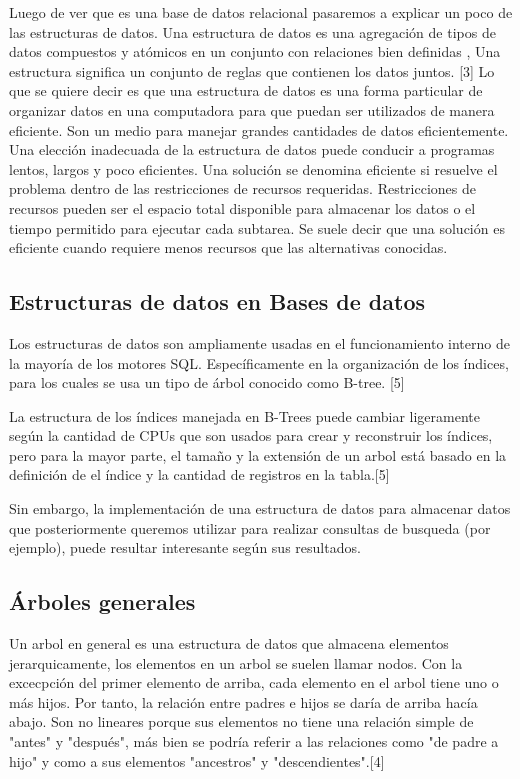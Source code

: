 \documentclass[twoside,twocolumn]{article}
\begin{document}
Luego de ver que es una base de datos relacional pasaremos a explicar un poco de las estructuras de datos.
Una estructura de datos  es una  agregación  de tipos  de datos  compuestos  y atómicos  en un conjunto  con relaciones  bien definidas , Una estructura  significa  un conjunto  de reglas  que contienen los datos juntos. [3]
Lo que se quiere decir es 	que una estructura de datos es una forma particular de organizar datos en una computadora para que puedan ser utilizados de manera eficiente. Son un medio para manejar grandes cantidades de datos eficientemente.
Una elección inadecuada de la estructura de datos puede conducir a programas lentos, largos y poco eficientes.
Una solución se denomina eficiente si resuelve el problema dentro de las restricciones de recursos requeridas. Restricciones de recursos pueden ser el espacio total disponible para almacenar los datos o el tiempo permitido para ejecutar cada subtarea. Se suele decir que una solución es eficiente cuando requiere menos recursos que las alternativas conocidas.

\subsection{Estructuras de datos en Bases de datos}
Los estructuras de datos son ampliamente usadas en el funcionamiento interno de la mayoría de los motores SQL. Específicamente en la organización de los índices, para los cuales se usa un tipo de árbol conocido como B-tree. [5]


La estructura de los índices manejada en B-Trees puede cambiar ligeramente según la cantidad de CPUs que son usados para crear y reconstruir los índices, pero para la mayor parte, el tamaño y la extensión de un arbol está basado en la definición de el índice y la cantidad de registros en la tabla.[5]


Sin embargo, la implementación de una estructura de datos para almacenar datos que posteriormente queremos utilizar para realizar consultas de busqueda (por ejemplo), puede resultar interesante según sus resultados.

\subsection{Árboles generales}
Un arbol en general es una estructura de datos que almacena elementos jerarquicamente, los elementos en un arbol se suelen llamar nodos. Con la excecpción del primer elemento de arriba, cada elemento en el arbol tiene uno o más hijos. Por tanto, la relación entre padres e hijos se daría de arriba hacía abajo. Son no lineares porque sus elementos no tiene una relación simple de "antes" y "después", más bien se podría referir a las relaciones como "de padre a hijo" y como a sus elementos "ancestros" y "descendientes".[4]
\end{document}
